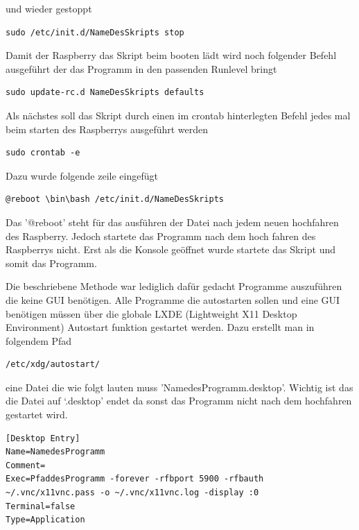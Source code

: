 \documentclass[11pt,a4paper]{article} %
\begin{document}
und wieder gestoppt
\begin{frame}

\begin{lstlisting}
sudo /etc/init.d/NameDesSkripts stop
\end{lstlisting}
\end{frame}

Damit der Raspberry das Skript beim booten lädt wird noch folgender Befehl ausgeführt der das Programm in den passenden Runlevel bringt
\begin{frame}

\begin{lstlisting}
sudo update-rc.d NameDesSkripts defaults
\end{lstlisting}
\end{frame}
\par

Als nächstes soll das Skript durch einen im crontab hinterlegten Befehl jedes mal beim starten des Raspberrys ausgeführt werden
\begin{frame}

\begin{lstlisting}
sudo crontab -e
\end{lstlisting}
\end{frame}
\newpage
Dazu wurde folgende zeile eingefügt
\begin{frame}

\begin{lstlisting}
@reboot \bin\bash /etc/init.d/NameDesSkripts
\end{lstlisting}
\end{frame}
Das '@reboot' steht für das ausführen der Datei nach jedem neuen hochfahren des Raspberry. Jedoch startete das Programm nach dem hoch fahren des Raspberrys nicht. Erst als die Konsole geöffnet wurde startete das Skript und somit das Programm.
\par
Die beschriebene Methode war lediglich dafür gedacht Programme auszuführen die keine GUI benötigen. Alle Programme die autostarten sollen und eine GUI benötigen müssen über die globale LXDE (Lightweight X11 Desktop Environment) Autostart funktion gestartet werden. \cite{13}
Dazu erstellt man in folgendem Pfad
\begin{frame}

\begin{lstlisting}
/etc/xdg/autostart/
\end{lstlisting}
\end{frame}
eine Datei die wie folgt lauten muss 'NamedesProgramm.desktop'. Wichtig ist das die Datei auf `.desktop' endet da sonst das Programm nicht nach dem hochfahren gestartet wird.
\begin{frame}

\begin{lstlisting}
[Desktop Entry]
Name=NamedesProgramm
Comment=
Exec=PfaddesProgramm -forever -rfbport 5900 -rfbauth ~/.vnc/x11vnc.pass -o ~/.vnc/x11vnc.log -display :0
Terminal=false
Type=Application
\end{lstlisting}
\end{frame}
\end{document}
